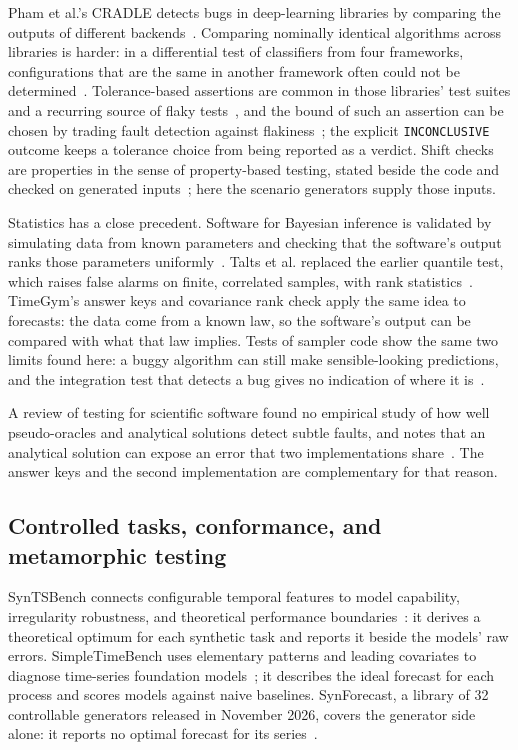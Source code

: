 \documentclass[11pt,a4paper]{article}
\newcommand{\code}[1]{\texttt{#1}}
\begin{document}
Pham et al.'s CRADLE detects bugs in deep-learning libraries by comparing
the outputs of different backends~\cite{pham2019cradle}.
Comparing nominally identical algorithms across libraries is harder: in a
differential test of classifiers from four frameworks, configurations
that are the same in another framework often could not be
determined~\cite{herbold2023differential}. Tolerance-based
assertions are common in those libraries' test suites and a recurring
source of flaky tests~\cite{nejadgholi2019study,dutta2020detecting}, and
the bound of such an assertion can be chosen by trading fault detection
against flakiness~\cite{xia2023balancing}; the
explicit \code{INCONCLUSIVE} outcome keeps a tolerance choice from being
reported as a verdict. Shift checks are properties in the sense of
property-based testing, stated beside the code and checked on generated
inputs~\cite{claessen2000quickcheck}; here the scenario generators supply
those inputs.

Statistics has a close precedent. Software for Bayesian inference is
validated by simulating data from known parameters and checking that the
software's output ranks those parameters
uniformly~\cite{geweke2004getting,cook2006validation,talts2020validating,modrak2025simulation}.
Talts et al. replaced the earlier quantile test, which raises false
alarms on finite, correlated samples, with rank
statistics~\cite{talts2020validating}.
TimeGym's answer keys and covariance rank check apply the same idea to
forecasts: the data come from a known law, so the software's output can be
compared with what that law implies.
Tests of sampler code show the same two limits found here: a buggy
algorithm can still make sensible-looking predictions, and the
integration test that detects a bug gives no indication of where it
is~\cite{grosse2014testing}.

A review of testing for scientific software found no empirical study of
how well pseudo-oracles and analytical solutions detect subtle faults, and
notes that an analytical solution can expose an error that two
implementations share~\cite{kanewala2014testing}. The answer keys and the
second implementation are complementary for that reason.


\subsection{Controlled tasks, conformance, and metamorphic testing}

SynTSBench connects configurable temporal
features to model capability, irregularity robustness, and theoretical
performance boundaries~\cite{tan2025syntsbench}: it derives a theoretical
optimum for each synthetic task and reports it beside the models' raw
errors. SimpleTimeBench uses elementary patterns and leading covariates
to diagnose time-series foundation
models~\cite{ghoroghchian2026simpletimebench}; it describes the ideal
forecast for each process and scores models against naive baselines.
SynForecast, a library of 32 controllable generators released in November
2026, covers the generator side alone: it reports no optimal forecast for
its series~\cite{sprangers2026synforecast}.
\end{document}
